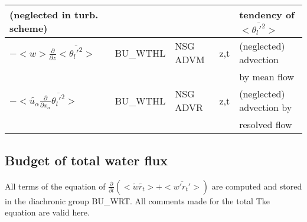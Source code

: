 \begin{center}
\begin{tabular}{||p{5cm}|>{\centering}p{2cm}|>{\centering}p{2.5cm}|>{\centering}p{0.5cm}|p{5.5cm }||}
(neglected in turb. scheme) & & & &tendency of $<\overline{\theta_l'^2}>$ \\
\hline
$-<w>\frac{\partial}{\partial z}<\overline{\theta_l'^2}>$  & BU\_WTHL & NSG ADVM & z,t & (neglected) advection \\
 & & & & by mean flow\\
\hline
$-<\tilde{u_\alpha}\frac{\partial}{\partial x_\alpha}\overline{\theta_l'^2}>$  & BU\_WTHL & NSG ADVR & z,t & (neglected) advection by\\
 & & & &resolved flow\\
\hline
\hline
\end{tabular}
\end{center}
\newpage
\subsection{Budget of total water flux}


All terms of the equation of $\frac{\partial}{\partial t} (<\tilde{w}\tilde{r_t}> + <\overline{w'r_t'}>)$ are
computed and stored in the diachronic group BU\_WRT. 
All comments made for the total Tke equation are valid here.\\

